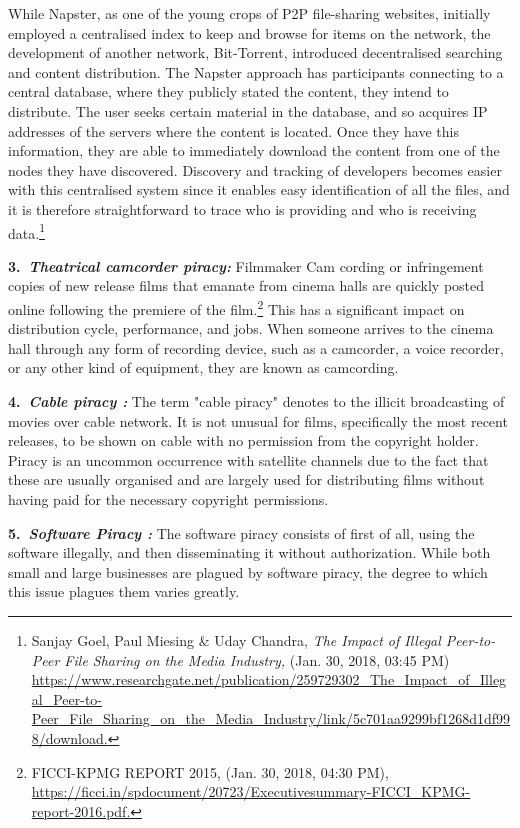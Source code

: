 \begin{multicols}{2}
\noi
While Napster, as one of the young crops of P2P file-sharing websites, initially employed a
centralised index to keep and browse for items on the network, the development of another
network, Bit-Torrent, introduced decentralised searching and content distribution. The
Napster approach has participants connecting to a central database, where they publicly stated
the content, they intend to distribute. The user seeks certain material in the database, and so
acquires IP addresses of the servers where the content is located. Once they have this
information, they are able to immediately download the content from one of the nodes they
have discovered. Discovery and tracking of developers becomes easier with this centralised
system since it enables easy identification of all the files, and it is therefore straightforward to
trace who is providing and who is receiving data.\footnote{Sanjay Goel, Paul Miesing \& Uday Chandra, \textit{The Impact of Illegal Peer-to-Peer File Sharing on the Media Industry,} (Jan. 30, 2018, 03:45 PM)  \url{https://www.researchgate.net/publication/259729302_The_Impact_of_Illegal_Peer-to-Peer_File_Sharing_on_the_Media_Industry/link/5c701aa9299bf1268d1df998/download.}}

\noi
{\large \bfseries 3.~\textit{Theatrical camcorder piracy:}}  Filmmaker Cam cording or infringement copies of new
release films that emanate from cinema halls are quickly posted online following the
premiere of the film.\footnote{FICCI-KPMG REPORT 2015, (Jan. 30, 2018, 04:30 PM),\\ \url{https://ficci.in/spdocument/20723/Executivesummary-FICCI_KPMG-report-2016.pdf.}} This has a significant impact on distribution cycle, performance, and jobs. When someone arrives to the cinema hall through any form of recording device, such as
a camcorder, a voice recorder, or any other kind of equipment, they are known as camcording.

\noi
{\large \bfseries 4.~\textit{Cable piracy :}} The term "cable piracy" denotes to the illicit broadcasting of movies over
cable network. It is not unusual for films, specifically the most recent releases, to be shown
on cable with no permission from the copyright holder. Piracy is an uncommon occurrence
with satellite channels due to the fact that these are usually organised and are largely used for
distributing films without having paid for the necessary copyright permissions.

\noi
{\large \bfseries 5.~\textit{Software Piracy :}} The software piracy consists of first of all, using the software illegally,
and then disseminating it without authorization. While both small and large businesses are
plagued by software piracy, the degree to which this issue plagues them varies greatly.


\end{multicols}
